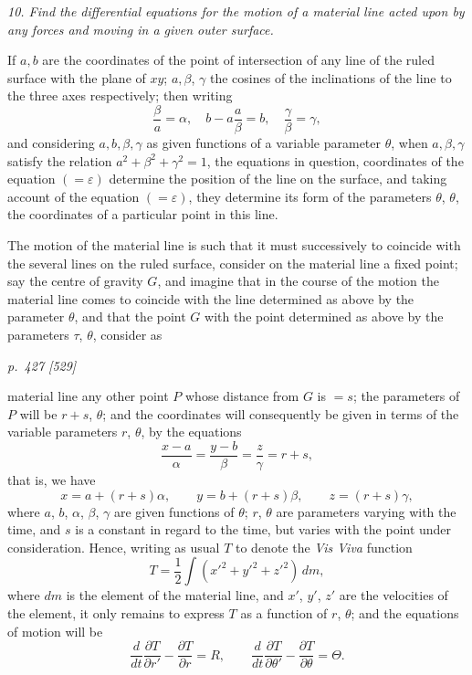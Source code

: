 \documentclass[11pt,a4paper]{article}
\theoremstyle{plain}
\theoremstyle{definition}
\begin{document}
\textit{10. Find the differential equations for the motion of a material line acted upon by any forces and moving in a given outer surface.}

If $a, b$ are the coordinates of the point of intersection of any line of the ruled
surface with the plane of $xy$; $a, \beta$, $\gamma$ the cosines of the inclinations of the line to
the three axes respectively; then writing
\[
\frac{\beta}{a} = \alpha,\quad b - a\frac{a}{\beta} = b,\quad \frac{\gamma}{\beta} = \gamma,
\]
and considering $a, b, \beta, \gamma$ as given functions of a variable parameter $\theta$, when
$a, \beta, \gamma$ satisfy the relation $a^2 + \beta^2 + \gamma^2 = 1$, the equations in question, coordinates of the
equation $(=\varepsilon)$ determine the position of the line on the surface, and taking account of the
equation $(=\varepsilon)$, they determine its form of the parameters $\theta$, $\theta$, the coordinates of a
particular point in this line.

The motion of the material line is such that it must successively to coincide with
the several lines on the ruled surface, consider on the material line a fixed point;
say the centre of gravity $G$, and imagine that in the course of the motion the material
line comes to coincide with the line determined as above by the parameter $\theta$, and that
the point $G$ with the point determined as above by the parameters $\tau$, $\theta$, consider as
\clearpage

\bigskip
\textit{p.~427 [529]}
\smallskip

material line any other point $P$ whose distance from $G$ is $=s$; the parameters of $P$
will be $r+s$, $\theta$; and the coordinates will consequently be given in terms of the variable
parameters $r$, $\theta$, by the equations
\[
\frac{x-a}{\alpha}=\frac{y-b}{\beta}=\frac{z}{\gamma}=r+s,
\]
that is, we have
\[
x=a+(r+s)\alpha,\qquad y=b+(r+s)\beta,\qquad z=(r+s)\gamma,
\]
where $a$, $b$, $\alpha$, $\beta$, $\gamma$ are given functions of $\theta$; $r$, $\theta$ are parameters varying with the
time, and $s$ is a constant in regard to the time, but varies with the point under
consideration. Hence, writing as usual $T$ to denote the \textit{Vis Viva} function
\[
T=\frac12\int (x'^2+y'^2+z'^2)\,dm,
\]
where $dm$ is the element of the material line, and $x'$, $y'$, $z'$ are the velocities of the
element, it only remains to express $T$ as a function of $r$, $\theta$; and the equations of
motion will be
\[
\frac{d}{dt}\frac{\partial T}{\partial r'}-\frac{\partial T}{\partial r}=R,\qquad
\frac{d}{dt}\frac{\partial T}{\partial \theta'}-\frac{\partial T}{\partial \theta}=\Theta.
\]
\end{document}
